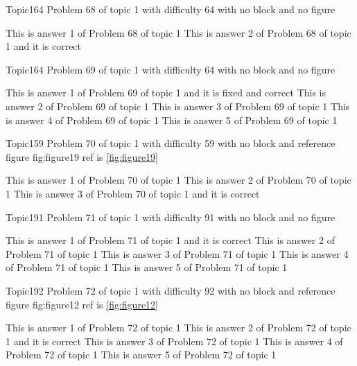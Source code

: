 \documentclass[master]{exam}
\begin{document}
\begin{problem}{Topic1}{64}
	Problem 68 of topic 1 with difficulty 64 with no block and no figure
	\begin{answers}
		\answer This is answer 1 of Problem 68 of topic 1 
		\answer[correct] This is answer 2 of Problem 68 of topic 1 and it is correct
	\end{answers}
\end{problem}

\begin{problem}{Topic1}{64}
	Problem 69 of topic 1 with difficulty 64 with no block and no figure
	\begin{answers}
		 This is answer 1 of Problem 69 of topic 1 and it is fixed and correct
		\answer This is answer 2 of Problem 69 of topic 1 
		\answer This is answer 3 of Problem 69 of topic 1 
		\answer This is answer 4 of Problem 69 of topic 1 
		\answer This is answer 5 of Problem 69 of topic 1 
	\end{answers}
\end{problem}

\begin{problem}{Topic1}{59}
	Problem 70 of topic 1 with difficulty 59 with no block and reference figure fig:figure19 ref is \ref{fig:figure19}
	\begin{answers}
		\answer This is answer 1 of Problem 70 of topic 1 
		\answer This is answer 2 of Problem 70 of topic 1 
		\answer[correct] This is answer 3 of Problem 70 of topic 1 and it is correct
	\end{answers}
\end{problem}

\begin{problem}{Topic1}{91}
	Problem 71 of topic 1 with difficulty 91 with no block and no figure
	\begin{answers}
		\answer[correct] This is answer 1 of Problem 71 of topic 1 and it is correct
		\answer This is answer 2 of Problem 71 of topic 1 
		\answer This is answer 3 of Problem 71 of topic 1 
		\answer This is answer 4 of Problem 71 of topic 1 
		\answer This is answer 5 of Problem 71 of topic 1 
	\end{answers}
\end{problem}

\begin{problem}{Topic1}{92}
	Problem 72 of topic 1 with difficulty 92 with no block and reference figure fig:figure12 ref is \ref{fig:figure12}
	\begin{answers}
		\answer This is answer 1 of Problem 72 of topic 1 
		\answer[correct] This is answer 2 of Problem 72 of topic 1 and it is correct
		\answer This is answer 3 of Problem 72 of topic 1 
		\answer This is answer 4 of Problem 72 of topic 1 
		\answer This is answer 5 of Problem 72 of topic 1 
	\end{answers}
\end{problem}
\end{document}
